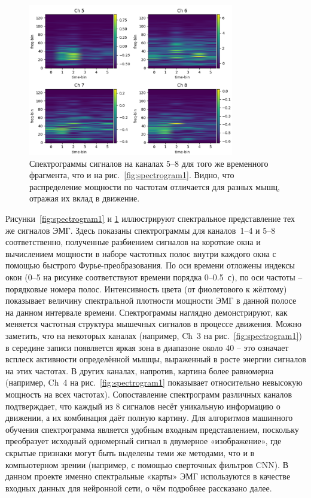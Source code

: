\documentclass[12pt,a4paper]{article}
\begin{document}
\begin{figure}[h]
\centering
\includegraphics[width=0.8\textwidth]{img4.png}
\caption{Спектрограммы сигналов на каналах 5--8 для того же временного фрагмента, что и на рис.~\ref{fig:spectrogram1}. Видно, что распределение мощности по частотам отличается для разных мышц, отражая их вклад в движение.}
\label{fig:spectrogram2}
\end{figure}

Рисунки~\ref{fig:spectrogram1} и \ref{fig:spectrogram2} иллюстрируют спектральное представление тех же сигналов ЭМГ. Здесь показаны спектрограммы для каналов~1--4 и 5--8 соответственно, полученные разбиением сигналов на короткие окна и вычислением мощности в наборе частотных полос внутри каждого окна с помощью быстрого Фурье-преобразования. По оси времени отложены индексы окон (0--5 на рисунке соответствуют времени порядка 0--0.5~с), по оси частоты – порядковые номера полос. Интенсивность цвета (от фиолетового к жёлтому) показывает величину спектральной плотности мощности ЭМГ в данной полосе на данном интервале времени. Спектрограммы наглядно демонстрируют, как меняется частотная структура мышечных сигналов в процессе движения. Можно заметить, что на некоторых каналах (например, Ch~3 на рис.~\ref{fig:spectrogram1}) в середине записи появляется яркая зона в диапазоне около 40 – это означает всплеск активности определённой мышцы, выраженный в росте энергии сигналов на этих частотах. В других каналах, напротив, картина более равномерна (например, Ch~4 на рис.~\ref{fig:spectrogram1} показывает относительно невысокую мощность на всех частотах). Сопоставление спектрограмм различных каналов подтверждает, что каждый из 8 сигналов несёт уникальную информацию о движении, а их комбинация даёт полную картину. Для алгоритмов машинного обучения спектрограмма является удобным входным представлением, поскольку преобразует исходный одномерный сигнал в двумерное «изображение», где скрытые признаки могут быть выделены теми же методами, что и в компьютерном зрении (например, с помощью сверточных фильтров CNN). В данном проекте именно спектральные «карты» ЭМГ используются в качестве входных данных для нейронной сети, о чём подробнее рассказано далее.
\end{document}
